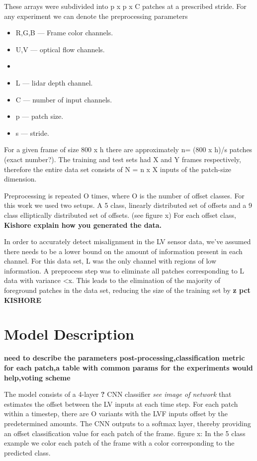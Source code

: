 \documentclass{article}
\begin{document}
These arrays were subdivided into p x p x C patches at a prescribed stride. For any experiment we can denote the preprocessing parameters 
\begin{itemize}
\item R,G,B --- Frame color channels.
\item U,V --- optical flow channels.
\item
\item L --- lidar depth channel.
\item C --- number of input channels.
\item p --- patch size.
\item s --- stride.
\end{itemize}  

For a given frame of size 800 x h there are approximately n= (800 x h)/s patches (exact number?). The training and test sets had X and Y frames respectively, therefore the entire data set consists of  N = n x X inputs of the patch-size dimension. 

Preprocessing is repeated O times, where O is the number of offset classes. For this work we used two setups. A 5 class, linearly distributed set of offsets and a 9 class elliptically distributed set of offsets. (see figure x) For each offset class, \textbf{Kishore explain how you generated the data.} 

In order to accurately detect misalignment in the LV sensor data, we've assumed there needs to be a lower bound on the amount of information present in each channel. For this data set, L was the only channel with regions of low information. A preprocess step was to eliminate all patches corresponding to L data with variance <x. This leads to the elimination of the majority of foreground patches in the data set, reducing the size of the training set by \textbf{z pct KISHORE}



\section{Model Description}
\textbf{need to describe the parameters post-processing,classification metric for each patch,a table with common params for the experiments would help,voting scheme}

The model consists of a 4-layer \textbf{?} CNN classifier \textit{see image of network} that estimates the offset between the LV inputs at each time step. For each patch within a timestep, there are O variants with the LVF inputs offset by the predetermined amounts. The CNN outputs to a softmax layer, thereby providing an offset classification value for each patch of the frame. 
figure x: In the 5 class example we color each patch of the frame with a color corresponding to the predicted class. 
\end{document}
